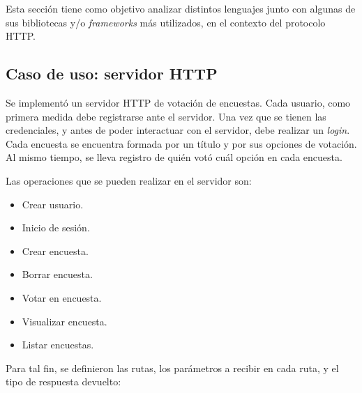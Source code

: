 \documentclass[11pt]{article}
\let\Oldsubsection\subsection
\renewcommand{\subsection}{\FloatBarrier\Oldsubsection}
\newcommand{\english}[1]{\textit{#1}}
\begin{document}
Esta sección tiene como objetivo analizar distintos lenguajes junto con algunas de sus bibliotecas y/o \english{frameworks} más utilizados, en el contexto del protocolo HTTP.

\subsection{Caso de uso: servidor HTTP}

Se implementó un servidor HTTP de votación de encuestas. Cada usuario, como primera medida debe registrarse ante el servidor. Una vez que se tienen las credenciales, y antes de poder interactuar con el servidor,  debe realizar un \english{login}. Cada encuesta se encuentra formada por un título y por sus opciones de votación. Al mismo tiempo, se lleva registro de quién votó cuál opción en cada encuesta.

Las operaciones que se pueden realizar en el servidor son:

\begin{itemize}
    \item Crear usuario.
    \item Inicio de sesión.
    \item Crear encuesta.
    \item Borrar encuesta.
    \item Votar en encuesta.
    \item Visualizar encuesta.
    \item Listar encuestas.
\end{itemize}

Para tal fin, se definieron las rutas, los parámetros a recibir en cada ruta, y el tipo de respuesta devuelto:
\end{document}
